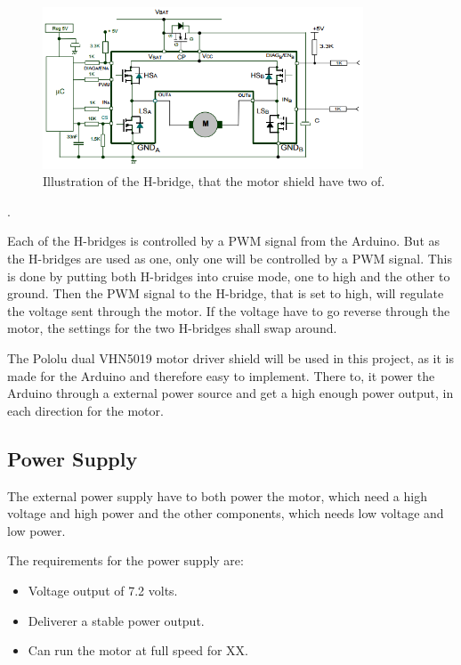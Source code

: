 \begin{figure}[H]
	\centering
	\includegraphics[width=0.85\textwidth]{figures/Hbridges}
		\caption{Illustration of the H-bridge, that the motor shield have two of.}
	\label{Hbridges}
\end{figure}.

Each of the H-bridges is controlled by a PWM signal from the Arduino. But as the H-bridges are used as one, only one will be controlled by a PWM signal. This is done by putting both H-bridges into cruise mode, one to high and the other to ground. Then the PWM signal to the H-bridge, that is set to high, will regulate the voltage sent through the motor. If the voltage have to go reverse through the motor, the settings for the two H-bridges shall swap around.

The Pololu dual VHN5019 motor driver shield will be used in this project, as it is made for the Arduino and therefore easy to implement. There to, it power the Arduino through a external power source and get a high enough power output, in each direction for the motor.




\subsection{Power Supply}
The external power supply have to both power the motor, which need a high voltage and high power and the other components, which needs low voltage and low power.

The requirements for the power supply are:
\begin{itemize}
\item Voltage output of 7.2 volts.
\item Deliverer a stable power output.
\item Can run the motor at full speed for XX. 
\end{itemize}

